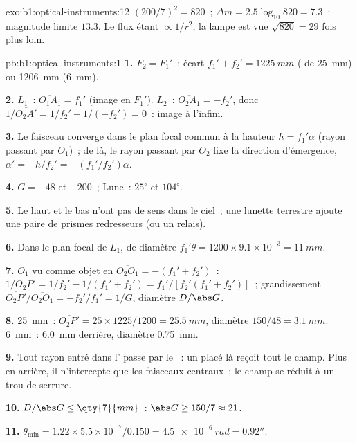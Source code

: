 \begin{solution}{exo:b1:optical-instruments:12}
$(200/7)^2 = 820$~; $\Delta m = 2.5\log_{10}820 = 7.3$~: magnitude limite
$13.3$. Le flux étant $\propto 1/r^2$, la lampe est vue
$\sqrt{820} = 29$ fois plus loin.
\end{solution}

\begin{solution}{pb:b1:optical-instruments:1}
\textbf{1.} $F_2 = F_1'$~: écart $f_1' + f_2' = \qty{1225}{mm}$
( de \qty{25}{mm}) ou \qty{1206}{mm} (\qty{6}{mm}).

\textbf{2.} $L_1$~: $\overline{O_1A_1} = f_1'$ (image en $F_1'$). $L_2$~:
$\overline{O_2A_1} = -f_2'$, donc $1/\overline{O_2A'} = 1/f_2' + 1/(-f_2')
= 0$~: image à l'infini.

\textbf{3.} Le faisceau converge dans le plan focal commun à la hauteur $h =
f_1'\alpha$ (rayon passant par $O_1$)~; de là, le rayon passant par $O_2$
fixe la direction d'émergence, $\alpha' = -h/f_2' = -(f_1'/f_2')\alpha$.

\textbf{4.} $G = -48$ et $-200$~; Lune~: $25^\circ$ et $104^\circ$.

\textbf{5.} Le haut et le bas n'ont pas de sens dans le ciel~; une
lunette terrestre ajoute une paire de prismes redresseurs (ou un relais).

\textbf{6.} Dans le plan focal de $L_1$, de diamètre $f_1'\theta = 1200 \times
9.1\times10^{-3} = \qty{11}{mm}$.

\textbf{7.} $O_1$ vu comme objet en $\overline{O_2O_1} = -(f_1' + f_2')$~:
$1/\overline{O_2P'} = 1/f_2' - 1/(f_1' + f_2') = f_1'/[f_2'(f_1' + f_2')]$~;
grandissement $\overline{O_2P'}/\overline{O_2O_1} = -f_2'/f_1' = 1/G$,
diamètre $D/\abs G$.

\textbf{8.} \qty{25}{mm}~: $\overline{O_2P'} = 25 \times 1225/1200 =
\qty{25.5}{mm}$, diamètre $150/48 = \qty{3.1}{mm}$. \qty{6}{mm}~:
\qty{6.0}{mm} derrière, diamètre \qty{0.75}{mm}.

\textbf{9.} Tout rayon entré dans l' passe par le ~: un  placé là reçoit tout le champ. Plus en arrière, il
n'intercepte que les faisceaux centraux~: le champ se réduit à un trou
de serrure.

\textbf{10.} $D/\abs G \leq \qty{7}{mm}$~: $\abs G \geq 150/7 \approx 21$.

\textbf{11.} $\theta_{\min} = 1.22 \times 5.5\times10^{-7}/0.150 =
\qty{4.5e-6}{rad} = 0.92''$.


\end{solution}
